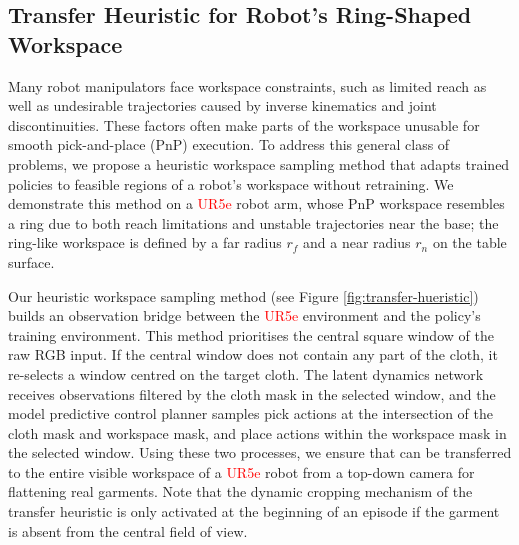 \documentclass[journal]{IEEEtran}
\newcommand{\addtypo}[1]{\textcolor{red}{#1}}
\newcommand{\addrealworld}[1]{\textcolor{brown!70!black}{#1}}
\begin{document}
\subsection{Transfer Heuristic for Robot's Ring-Shaped Workspace} \label{sec:transfer-hueristic}
Many robot manipulators face workspace constraints, such as limited reach as well as undesirable trajectories caused by inverse kinematics and joint discontinuities. These factors often make parts of the workspace unusable for smooth pick-and-place (PnP) execution. To address this general class of problems, we propose a heuristic workspace sampling method that adapts trained policies to feasible regions of a robot’s workspace without retraining. We demonstrate this method on a \addtypo{UR5e} robot arm, whose PnP workspace resembles a ring due to both reach limitations and unstable trajectories near the base; the ring-like workspace is defined by a far radius $r_f$ and a near radius $r_n$ on the table surface.



Our heuristic workspace sampling method (see Figure \ref{fig:transfer-hueristic}) builds an observation bridge between the \addtypo{UR5e} environment and the policy's training environment. This method prioritises the central square window of the raw RGB input. If the central window does not contain any part of the cloth, it re-selects a window centred on the target cloth. The  latent dynamics network receives observations filtered by the cloth mask in the selected window, and the model predictive control planner samples pick actions at the intersection of the cloth mask and workspace mask, and place actions within the workspace mask in the selected window. Using these two processes, we ensure that  can be transferred to the entire visible workspace of a \addtypo{UR5e} robot from a top-down camera for flattening real garments. \addrealworld{Note that the dynamic cropping mechanism of the transfer heuristic is only activated at the beginning of an episode if the garment is absent from the central field of view.}
\end{document}
